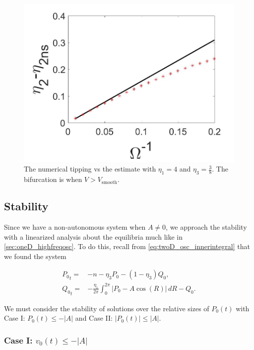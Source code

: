 \begin{figure}[H]
\centering
\includegraphics[scale=.25]{twoD/osc_Omegacomp.jpg}
\caption{The numerical tipping vs the estimate with $\eta_1=4$ and $\eta_3=\frac{3}{8}$. The bifurcation is when $V>V_{\text{smooth}}$.}
\label{fig:twoD_osc_epscomp}
\end{figure}

\subsection{Stability}

Since we have a non-autonomous system when $A\not=0$, we approach the stability with a linearized analysis about the equilibria much like in \autoref{sec:oneD_highfreqosc}. To do this, recall from \eqref{eq:twoD_osc_innerintegral} that we found the system

\begin{equation}\label{eq:twoD_osc_stabilityequation}
\begin{aligned}
{P_0}_t =& -n -\eta_3 P_0-(1-\eta_3)Q_0,\\
{Q_0}_t =& -\frac{\eta_1}{2\pi}\int_0^{2\pi}|P_0-A\cos(R)|\, dR - Q_0.
\end{aligned}
\end{equation}

We must consider the stability of solutions over the relative sizes of $P_0(t)$ with Case I: $P_0(t)\le -|A|$ and Case II: $|P_0(t)|\le |A|$.

\subsubsection{Case I: $v_0(t)\le -|A|$}

